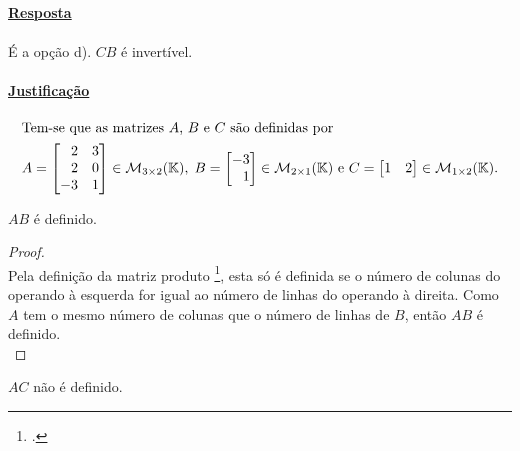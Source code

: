 \grupo{}

\exercicio{}

\paragraph{\underline{Resposta}}

\paragraph{}É a opção d). $CB$ é invertível.

\paragraph{\underline{Justificação}}

\begin{align*}
	\intertext{Tem-se que as matrizes $A$, $B$ e $C$ são definidas por}
	A =
	\begin{bmatrix*}[r]
		2  & 3\\
		2  & 0\\
		-3 & 1
	\end{bmatrix*}
	\in
	\mathcal{M}_{3 \times 2}(\mathbb{K})
	,\;
	B =
	\begin{bmatrix*}[r]
		-3\\
		1
	\end{bmatrix*}
	\in
	\mathcal{M}_{2 \times 1}(\mathbb{K})
	 \text{ e }
	C =
	\begin{bmatrix*}[r]
		1  & 2
	\end{bmatrix*}
	\in
	\mathcal{M}_{1 \times 2}(\mathbb{K})
	.
\end{align*}

\begin{proposition}\label{prop:i-1-a}
	$AB$ é definido.
\end{proposition}

\begin{proof}
	\; \\
	Pela definição da matriz produto
	\footcite[pág. 12, Definição 1.18: matriz produto]{Cabral2012},
	esta só é definida se o número de colunas do
	operando à esquerda for igual ao número de linhas do operando à
	direita. Como
	$A$ tem o mesmo número de colunas que o número de linhas de $B$,
	então $AB$ é definido.\\
\end{proof}

\begin{proposition}\label{prop:i-1-b}
	$AC$ não é definido.
\end{proposition}

